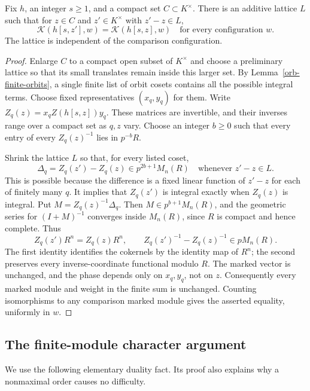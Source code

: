 \begin{proposition}\label{orb-local-constancy-proved}
Fix $h$, an integer $s\ge1$, and a compact set
$C\subset K^\times$.  There is an additive lattice $L$ such
that for $z\in C$ and $z'\in K^\times$ with $z'-z\in L$,
\[
 \mathcal K(h[s,z'],w)=\mathcal K(h[s,z],w)
 \quad\text{for every configuration }w.
\]
The lattice is independent of the comparison configuration.
\end{proposition}

\begin{proof}
Enlarge $C$ to a compact open subset of $K^\times$ and choose
a preliminary lattice so that its small translates remain
inside this larger set.  By Lemma~\ref{orb-finite-orbits}, a
single finite list of orbit cosets contains all the possible
integral terms.  Choose fixed representatives $(x_q,y_q)$
for them.  Write
$Z_q(z)=x_qZ(h[s,z])y_q$.
These matrices are invertible, and their inverses range over
a compact set as $q,z$ vary.  Choose an integer $b\ge0$
such that every entry of every $Z_q(z)^{-1}$ lies in
$p^{-b}R$.

Shrink the lattice $L$ so that, for every listed coset,
\[
 \Delta_q=Z_q(z')-Z_q(z)\in p^{2b+1}M_n(R)
 \quad\text{whenever }z'-z\in L.
\]
This is possible because the difference is a fixed linear
function of $z'-z$ for each of finitely many $q$.
It implies that $Z_q(z')$ is integral exactly when $Z_q(z)$
is integral.  Put $M=Z_q(z)^{-1}\Delta_q$.
Then $M\in p^{b+1}M_n(R)$, and the geometric series for
$(I+M)^{-1}$ converges inside $M_n(R)$, since $R$ is compact
and hence complete.  Thus
\[
 Z_q(z')R^n=Z_q(z)R^n,
 \qquad Z_q(z')^{-1}-Z_q(z)^{-1}\in pM_n(R).
\]
The first identity identifies the cokernels by the identity
map of $R^n$; the second preserves every inverse-coordinate
functional modulo $R$.  The marked vector is unchanged,
and the phase depends only on $x_q,y_q$, not on $z$.
Consequently every marked module and weight in the finite
sum is unchanged.  Counting isomorphisms to any comparison
marked module gives the asserted equality, uniformly in $w$.
\end{proof}

\subsection{The finite-module character argument}

We use the following elementary duality fact.  Its proof also
explains why a nonmaximal order causes no difficulty.

